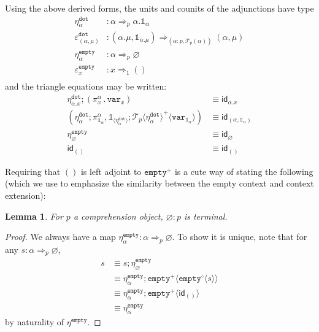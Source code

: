 \documentclass[10pt]{article}
\newtheorem{lemma}{Lemma}
\theoremstyle{definition}
\let\emptyset\varnothing
\newcommand{\tcell}{\Rightarrow}
\newcommand{\sigmacl}[3]{\ensuremath{(#1{:}#2,#3)}}
\newcommand{\id}{\mathsf{id}}
\newcommand\El[2]{\mathcal{T}_{#1}(#2)}
\newcommand\ApEl[2]{\mathcal{T}_{#1}\langle#2\rangle}
\newcommand\bdot[0]{\mathbin{.}}
\newcommand\ApPlus[2]{\ensuremath{{#1}^+ \langle #2 \rangle }}
\newcommand\ApCirc[2]{\ensuremath{{#1}^\circ \langle #2 \rangle }}
\newcommand{\tdot}{\ensuremath{\mathtt{dot}}}
\newcommand{\tempty}{\ensuremath{\mathtt{empty}}}
\newcommand\One{\ensuremath{\mathds{1}}}
\newcommand\var[1]{\ensuremath{\mathtt{var}_{#1}}}
\newcommand\ApOne[1]{\ensuremath{\One_{\langle {#1} \rangle }}}
\begin{document}
Using the above derived forms, the units and counits of the adjunctions have type
\begin{align*}
\eta^\tdot_\alpha {}&: \alpha \tcell_p \alpha.\One_\alpha \\
\varepsilon^\tdot_{(\alpha, \mu)} {}&: (\alpha.\mu, \One_{\alpha.\mu}) \tcell_{\sigmacl{\alpha}{p}{\El{p}{\alpha}}} (\alpha, \mu) \\
\eta^\tempty_\alpha {}&: \alpha \tcell_p \emptyset \\
\varepsilon^\tempty_{x} {}&: x \tcell_1 () \\
\end{align*}
and the triangle equations may be written:
\begin{align}
\label{eq:chi-triangle-1} \eta^\tdot_{\alpha.x};(\pi_x^\alpha \bdot \var{x}) &\equiv \id_{\alpha.x} \\
\label{eq:chi-triangle-2} (\eta^\tdot_\alpha ; \pi^\alpha_{\One_\alpha}, \ApOne{\eta^\tdot_\alpha} ; \ApPlus{\ApEl{p}{\eta^\tdot_\alpha}}{\var{\One_\alpha}}) &\equiv \id_{(\alpha, \One_\alpha)}\\
\eta^\tempty_\emptyset &\equiv \id_\emptyset \\
\id_{()}&\equiv \id_{()}
\end{align}

Requiring that $()$ is left adjoint to $\tempty^+$ is a cute way of
stating the following (which we use to emphasize the similarity between
the empty context and context extension):
\begin{lemma}
For $p$ a comprehension object, $\emptyset : p$ is terminal.
\end{lemma}
\begin{proof}
We always have a map $\eta^\tempty_\alpha : \alpha \tcell_p \emptyset$. To show it is unique, note that for any $s : \alpha \tcell_p \emptyset$,
\begin{align*}
s 
&\equiv s ; \eta^\tempty_\emptyset \\
&\equiv \eta^\tempty_\alpha ; \ApPlus{\tempty}{\ApCirc{\tempty}{s}} \\
&\equiv \eta^\tempty_\alpha ; \ApPlus{\tempty}{\id_{()}} \\
&\equiv \eta^\tempty_\alpha
\end{align*}
by naturality of $\eta^\tempty$.
\end{proof}
\end{document}
